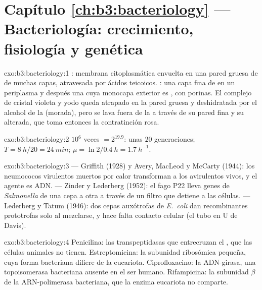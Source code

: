 \section*{Capítulo \ref{ch:b3:bacteriology} --- Bacteriología: crecimiento, fisiología y genética}

\begin{solution}{exo:b3:bacteriology:1}
: membrana citoplasmática envuelta en una pared gruesa de
 de muchas capas, atravesada por ácidos teicoicos.
: una capa fina de  en un periplasma y después
una  cuya monocapa exterior es , con
porinas. El complejo de cristal violeta y yodo queda atrapado en la pared
gruesa y deshidratada por el alcohol de la  (morada), pero se
lava fuera de la  a través de su pared fina y su  alterada, que toma entonces la contratinción rosa.
\end{solution}

\begin{solution}{exo:b3:bacteriology:2}
$10^{6}$ veces $= 2^{19.9}$: unas $20$ generaciones; $T = \qty{8}{h}/20
= \qty{24}{min}$; $\mu = \ln 2/\qty{0.4}{h} = \qty{1.7}{h^{-1}}$.
\end{solution}

\begin{solution}{exo:b3:bacteriology:3}
 --- Griffith (1928) y Avery, MacLeod y McCarty (1944):
los neumococos virulentos muertos por calor transforman a los avirulentos
vivos, y el agente es ADN.  --- Zinder y Lederberg (1952): el
fago P22 lleva genes de \emph{Salmonella} de una cepa a otra a través de
un filtro que detiene a las células.  --- Lederberg y Tatum
(1946): dos cepas auxótrofas de \emph{E.~coli} dan recombinantes
prototrofas solo al mezclarse, y hace falta contacto celular (el tubo en
U de Davis).
\end{solution}

\begin{solution}{exo:b3:bacteriology:4}
Penicilina: las transpeptidasas que entrecruzan el , que
las células animales no tienen. Estreptomicina: la subunidad ribosómica
pequeña, cuya forma bacteriana difiere de la eucariota. Ciprofloxacino:
la ADN-girasa, una topoisomerasa bacteriana ausente en el ser humano.
Rifampicina: la subunidad $\beta$ de la ARN-polimerasa bacteriana, que la
enzima eucariota no comparte.
\end{solution}

